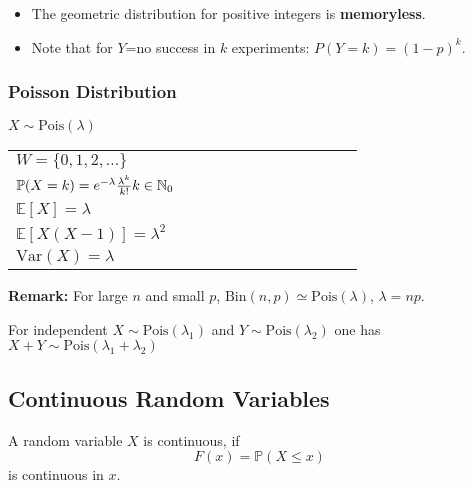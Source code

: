 \renewcommand{\arraystretch}{1}
\setlength\tabcolsep{\oldtabcolsep}
\begin{itemize}
    \item The geometric distribution for positive integers is \textbf{memoryless}.
    \item Note that for $Y$=no success in $k$ experiments: $P(Y=k)={(1-p)}^k$.
\end{itemize}

\subsubsection{Poisson Distribution}
$X \sim \mathrm{Pois}(\lambda)$

\renewcommand{\arraystretch}{1.3}
\setlength{\oldtabcolsep}{\tabcolsep}\setlength\tabcolsep{3pt}
\begin{tabularx}{\linewidth}{@{}p{0.5\linewidth}p{0.49\linewidth}@{}}
    $W=\{0,1,2,\ldots\}$                                                        &
    \multirow{4}{*}{
        
    }                                                                             \\
    $\mathbb{P}(X=k)=e^{-\lambda}\frac{\lambda^k}{k!}\newline k\in\mathbb{N}_0$ & \\
    $\mathbb{E}[X] = \lambda$                                                   & \\
    $\mathbb{E}[X(X-1)] = \lambda^2$                                            & \\
    $\mathrm{Var}(X) = \lambda$                                                 &
\end{tabularx}
\renewcommand{\arraystretch}{1}
\setlength\tabcolsep{\oldtabcolsep}
\textbf{Remark:} For large $n$ and small $p$, $\mathrm{Bin}(n,p)\simeq \mathrm{Pois}(\lambda)$, $\lambda=np$.

For independent $X \sim \mathrm{Pois}(\lambda_1)$ and $Y \sim \mathrm{Pois}(\lambda_2)$ one has $X+Y \sim \mathrm{Pois}(\lambda_1 +\lambda_2)$

\subsection{Continuous Random Variables}
A random variable $X$ is continuous, if
\noindent\begin{equation*}
    F(x)=\mathbb{P}(X\leq x)
\end{equation*}
is continuous in $x$.


